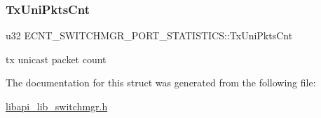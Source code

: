 \subsubsection{\texorpdfstring{Tx\+Uni\+Pkts\+Cnt}{TxUniPktsCnt}}
{\footnotesize\ttfamily u32 E\+C\+N\+T\+\_\+\+S\+W\+I\+T\+C\+H\+M\+G\+R\+\_\+\+P\+O\+R\+T\+\_\+\+S\+T\+A\+T\+I\+S\+T\+I\+C\+S\+::\+Tx\+Uni\+Pkts\+Cnt}

tx unicast packet count 

The documentation for this struct was generated from the following file\+:\begin{DoxyCompactItemize}
\item 
\hyperlink{libapi__lib__switchmgr_8h}{libapi\+\_\+lib\+\_\+switchmgr.\+h}\end{DoxyCompactItemize}
